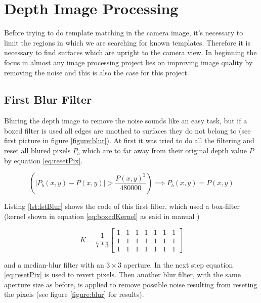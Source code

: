 \section{Depth Image Processing}
Before trying to do template matching in the camera image, it's necessary to limit the regions in which we are
searching for known templates. Therefore it is necessary to find surfaces which are upright to the camera view.
In beginning the focus in almost any image processing project lies on improving image quality by removing the 
noise and this is also the case for this project.

\subsection{First Blur Filter}
Bluring the depth image to remove the noise sounds like an easy task, but if a boxed filter is used 
all edges are smothed to surfaces they do not belong to (see first picture in figure \vref{figure:blur}).
At first it was tried to do all the filtering and reset all blured pixels $P_b$ which are to far away from their 
original depth value $P$ by equation \ref{eq:resetPix}.
 
\begin{equation}
   \left(\left|{P_b(x,y)-P(x,y)}\right|>{\frac{P(x,y)^2}{480000}}\right)\implies P_b(x,y)=P(x,y)
   \label{eq:resetPix}
\end{equation}

Listing \vref{lst:fstBlur} shows the code of this first filter, which used a box-filter
(kernel shown in equation \vref{eq:boxedKernel} as said in manual \cite{willowgarage:opencv:boxed})

\begin{equation}
	K=\frac{1}{7*3}
	\begin{bmatrix} 1 & 1 & 1 & 1 & 1 & 1 & 1\\ 
					1 & 1 & 1 & 1 & 1 & 1 & 1\\ 
					1 & 1 & 1 & 1 & 1 & 1 & 1 
	\end{bmatrix}
	\label{eq:boxedKernel}
\end{equation}

and a median-blur filter with an $3 \times 3$ aperture. In the next step equation \ref{eq:resetPix} is used 
to revert pixels. Then another blur filter, with the same aperture size as before, 
is applied to remove possible noise resulting from reseting the pixels (see figure \vref{figure:blur} for results).

